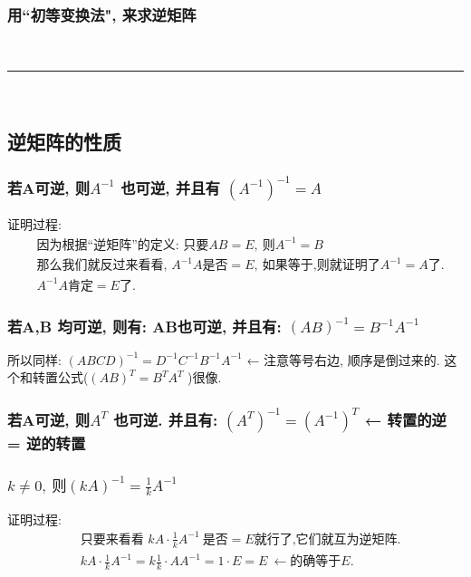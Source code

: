 \documentclass[UTF8]{ctexart}
\begin{document}
\subsubsection{用``初等变换法", 来求逆矩阵 }
	
	

~\\
\hrule
~\\


\subsection{逆矩阵的性质}


\subsubsection{若A可逆, 则$A^{-1}$ 也可逆, 并且有 $\left( A^{-1} \right) ^{-1}=A$ }

证明过程: 
\begin{align*}
		& \text{因为根据}\text{逆矩阵}\text{的定义:\ 只要}AB=E,\ \text{则}A^{-1}=B\\
	& \text{那么我们就反过来看看,\ }A^{-1}A\text{是否}=E,\ \text{如果等于,则就证明了}A^{-1}=A\text{了}.\\
	& A^{-1}A\text{肯定}=E\text{了}.
\end{align*}


\subsubsection{若A,B 均可逆, 则有: AB也可逆, 并且有: $\left( AB \right) ^{-1}=B^{-1}A^{-1}$}

所以同样: $
\left( ABCD \right) ^{-1}=D^{-1}C^{-1}B^{-1}A^{-1}  
$  ← 注意等号右边, 顺序是倒过来的. 这个和转置公式($\left( AB \right) ^T=B^TA^T$ )很像. 


\subsubsection{若A可逆, 则$A^T$ 也可逆. 并且有: $\left( A^T \right) ^{-1}=\left( A^{-1} \right) ^T$ ← 转置的逆 = 逆的转置}


\subsubsection{$k\ne 0,\ \text{则}\left( kA \right) ^{-1}=\frac{1}{k}A^{-1}$}

证明过程:
\begin{align*}
		& \text{只要来看看\ }kA\cdot \frac{1}{k}A^{-1}\ \text{是否}=E\text{就行了,它们就互为逆矩阵}.\\
	& kA\cdot \frac{1}{k}A^{-1}=k\frac{1}{k}\cdot AA^{-1}=1\cdot E=E\ ←\text{的确等于}E.
\end{align*}
\end{document}
